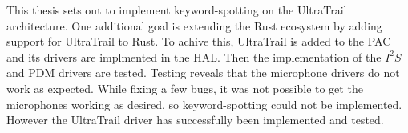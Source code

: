 This thesis sets out to implement keyword-spotting on the UltraTrail architecture.
One additional goal is extending the Rust ecosystem by adding support for UltraTrail to Rust.
To achive this, UltraTrail is added to the PAC and its drivers are implmented in the HAL.
Then the implementation of the $I^2S$ and PDM drivers are tested.
Testing reveals that the microphone drivers do not work as expected.
While fixing a few bugs, it was not possible to get the microphones working as
desired, so keyword-spotting could not be implemented.
However the UltraTrail driver has successfully been implemented and tested.
